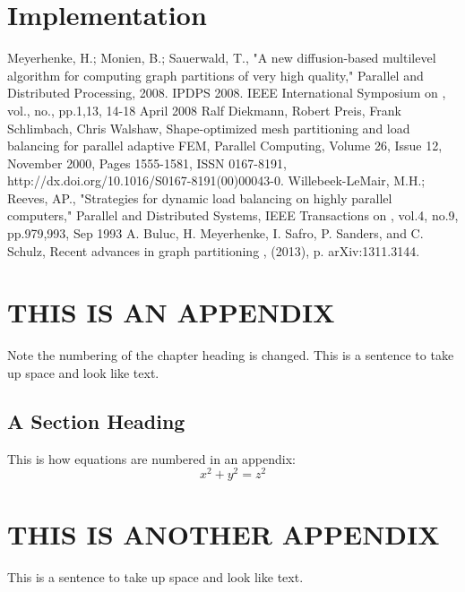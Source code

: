 \documentclass{thesis}
\begin{document}
\chapter{Implementation}
\begin{singlespace}
\begin{thebibliography}{99}
 Meyerhenke, H.; Monien, B.; Sauerwald, T., "A new diffusion-based multilevel algorithm for computing graph partitions of very high quality," Parallel and Distributed Processing, 2008. IPDPS 2008. IEEE International Symposium on , vol., no., pp.1,13, 14-18 April 2008
 Ralf Diekmann, Robert Preis, Frank Schlimbach, Chris Walshaw, Shape-optimized mesh partitioning and load balancing for parallel adaptive FEM, Parallel Computing, Volume 26, Issue 12, November 2000, Pages 1555-1581, ISSN 0167-8191, http://dx.doi.org/10.1016/S0167-8191(00)00043-0.
 Willebeek-LeMair, M.H.; Reeves, AP., "Strategies for dynamic load balancing on highly parallel computers," Parallel and Distributed Systems, IEEE Transactions on , vol.4, no.9, pp.979,993, Sep 1993
 A. Buluc, H. Meyerhenke, I. Safro, P. Sanders, and C. Schulz, Recent advances in graph partitioning , (2013), p. arXiv:1311.3144.

\end{thebibliography}
\end{singlespace}

\appendix    %
\chapter{THIS IS AN APPENDIX}
Note the numbering of the chapter heading is changed.
This is a sentence to take up space and look like text.
\section{A Section Heading}
This is how equations are numbered in an appendix:
\begin{equation}
x^2 + y^2 = z^2
\end{equation} 

\chapter{THIS IS ANOTHER APPENDIX}
This is a sentence to take up space and look like text.
\end{document}
